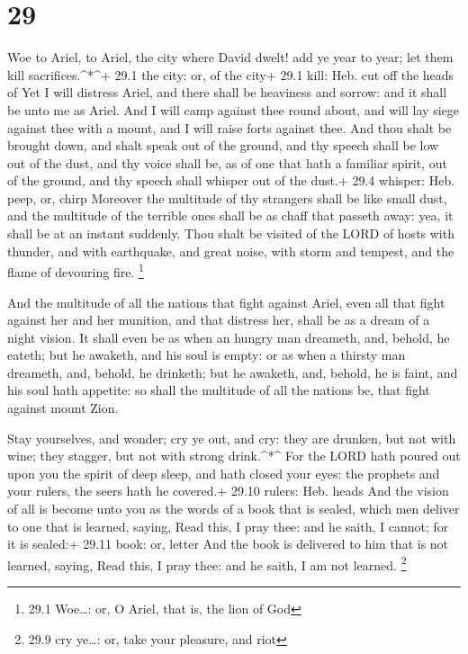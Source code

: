 \hypertarget{section-28}{%
\section{29}\label{section-28}}

 Woe to Ariel, to Ariel, the city where David dwelt! add ye
year to year; let them kill sacrifices.\^{}*\^{}+ 29.1 the city: or, of
the city+ 29.1 kill: Heb. cut off the heads of  Yet I will
distress Ariel, and there shall be heaviness and sorrow: and it shall be
unto me as Ariel.  And I will camp against thee round about,
and will lay siege against thee with a mount, and I will raise forts
against thee.  And thou shalt be brought down, and shalt
speak out of the ground, and thy speech shall be low out of the dust,
and thy voice shall be, as of one that hath a familiar spirit, out of
the ground, and thy speech shall whisper out of the dust.+ 29.4 whisper:
Heb. peep, or, chirp  Moreover the multitude of thy
strangers shall be like small dust, and the multitude of the terrible
ones shall be as chaff that passeth away: yea, it shall be at an instant
suddenly.  Thou shalt be visited of the LORD of hosts with
thunder, and with earthquake, and great noise, with storm and tempest,
and the flame of devouring fire. \footnote{29.1 Woe\ldots: or, O Ariel,
  that is, the lion of God}

 And the multitude of all the nations that fight against
Ariel, even all that fight against her and her munition, and that
distress her, shall be as a dream of a night vision.  It
shall even be as when an hungry man dreameth, and, behold, he eateth;
but he awaketh, and his soul is empty: or as when a thirsty man
dreameth, and, behold, he drinketh; but he awaketh, and, behold, he is
faint, and his soul hath appetite: so shall the multitude of all the
nations be, that fight against mount Zion.

 Stay yourselves, and wonder; cry ye out, and cry: they are
drunken, but not with wine; they stagger, but not with strong
drink.\^{}*\^{}  For the LORD hath poured out upon you the
spirit of deep sleep, and hath closed your eyes: the prophets and your
rulers, the seers hath he covered.+ 29.10 rulers: Heb. heads
 And the vision of all is become unto you as the words of a
book that is sealed, which men deliver to one that is learned, saying,
Read this, I pray thee: and he saith, I cannot; for it is sealed:+ 29.11
book: or, letter  And the book is delivered to him that is
not learned, saying, Read this, I pray thee: and he saith, I am not
learned. \footnote{29.9 cry ye\ldots: or, take your pleasure, and riot}


